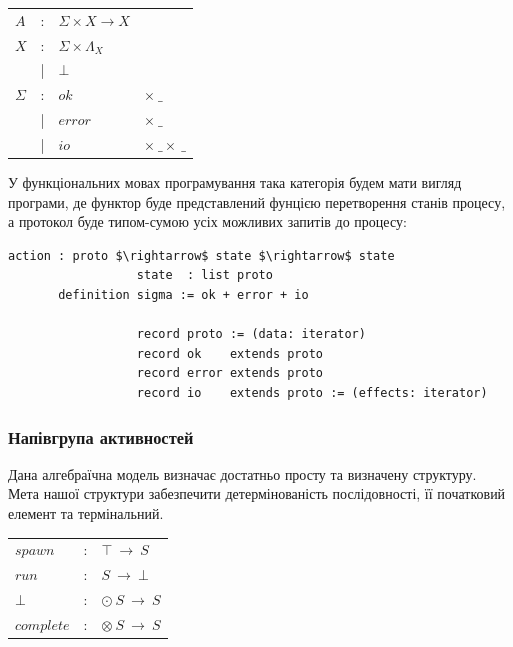 \documentclass[11pt,oneside]{article}
\begin{document}
\begin{center}
\begin{tabular}{lcll}
$A$         &:& $\Sigma \times X \rightarrow X  $ &\\
$X$         &:& $\Sigma \times \Lambda_{X} $ &\\
            &|& $\bot                              $ &\\
$\Sigma$    &:& $ok$    & $\times\ \_$          \\
            &|& $error$ & $\times\ \_$          \\
            &|& $io$    & $\times\ \_ \times\ \_$          \\
\end{tabular}
\end{center}

   У функціональних мовах програмування така категорія будем мати вигляд програми,
   де функтор буде представлений фунцією перетворення станів процесу, а протокол
   буде типом-сумою усіх можливих запитів до процесу:

\begin{center}
\begin{lstlisting}[mathescape=true]
                  action : proto $\rightarrow$ state $\rightarrow$ state
                  state  : list proto
       definition sigma := ok + error + io

                  record proto := (data: iterator)
                  record ok    extends proto
                  record error extends proto
                  record io    extends proto := (effects: iterator)
\end{lstlisting}
\end{center}

  \subsubsection{Напівгрупа активностей}

  Дана алгебраїчна модель визначає достатньо просту та визначену структуру.
  Мета нашої структури забезпечити детермінованість послідовності,
  її початковий елемент та термінальний. 

\begin{center}
\begin{tabular}{lcl}
$spawn$       &:& $\top\ \rightarrow\ S$\\
$run$         &:& $S\ \rightarrow\ \bot$\\
$\bot$        &:& $\odot\ S\ \rightarrow\ S$\\
$complete$    &:& $\otimes\ S\ \rightarrow\ S$\\
\end{tabular}
\end{center}
\end{document}
